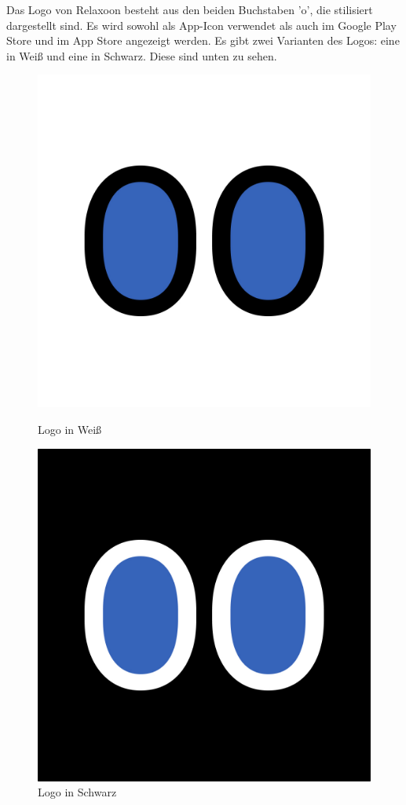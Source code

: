 Das Logo von Relaxoon besteht aus den beiden Buchstaben 'o', die stilisiert dargestellt sind.
Es wird sowohl als App-Icon verwendet als auch im Google Play Store und im App Store angezeigt werden. Es gibt zwei
Varianten des Logos: eine in Weiß und eine in Schwarz. Diese sind unten zu sehen.

\begin{figure}[H]
    \begin{minipage}{0.5\textwidth}
        \centering
        \includegraphics[height=0.8\textwidth]{./pics/Relaxoon Logo White.jpg}
        \caption{Logo in Weiß}
    \end{minipage}
    \begin{minipage}{0.5\textwidth}
        \centering
        \includegraphics[height=0.8\textwidth]{./pics/Relaxoon Logo Black.jpg}
        \caption{Logo in Schwarz}
    \end{minipage}
\end{figure}